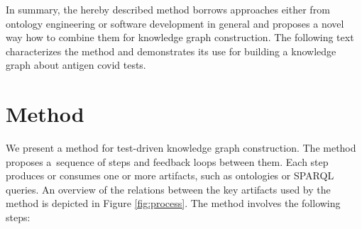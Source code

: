 \documentclass[
]{ceurart}
\begin{document}
In summary, the hereby described method borrows approaches either from ontology engineering or software development in general and proposes a novel way how to combine them for knowledge graph construction. The following text characterizes the method and demonstrates its use for building a knowledge graph about antigen covid tests.

\section{Method}


We present a method for test-driven knowledge graph construction. The method proposes a~sequence of steps and feedback loops between them. Each step produces or consumes one or more artifacts, such as ontologies or SPARQL queries. An overview of the relations between the key artifacts used by the method is depicted in Figure \ref{fig:process}. The method involves the following steps:
\end{document}
